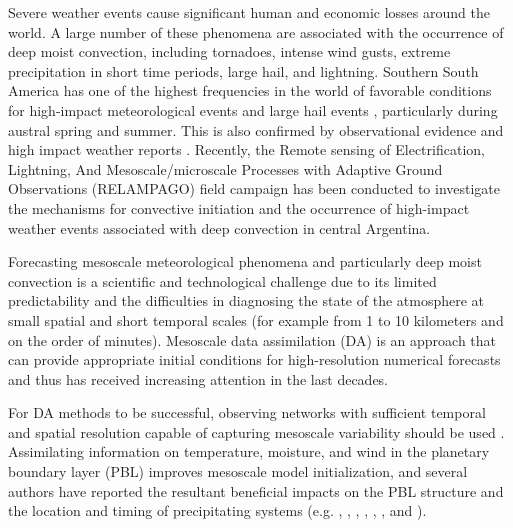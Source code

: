 \documentclass[final,5p,times,twocolumn,authoryear]{elsarticle} %
\begin{document}
Severe weather events cause significant human and economic losses around the world. A large number of these phenomena are associated with the occurrence of deep moist convection, including tornadoes, intense wind gusts, extreme precipitation in short time periods, large hail, and lightning.
Southern South America has one of the highest frequencies in the world of favorable conditions for high-impact meteorological events \citep{brooks2003} and large hail events \citep{cecil2012}, particularly during austral spring and summer.
This is also confirmed by observational evidence and high impact weather reports \citep{matsudo2015, rasmussen2014}. Recently, the Remote sensing of Electrification, Lightning, And Mesoscale/microscale Processes with Adaptive Ground Observations (RELAMPAGO) field campaign \citep{nesbitt2021} has been conducted to investigate the mechanisms for convective initiation and the occurrence of high-impact weather events associated with deep convection in central Argentina.

Forecasting mesoscale meteorological phenomena and particularly deep moist convection is a scientific and technological challenge due to its limited predictability and the difficulties in diagnosing the state of the atmosphere at small spatial and short temporal scales (for example from 1 to 10 kilometers and on the order of minutes). Mesoscale data assimilation (DA) is an approach that can provide appropriate initial conditions for high-resolution numerical forecasts \citep{sun2014} and thus has received increasing attention in the last decades.

For DA methods to be successful, observing networks with sufficient temporal and spatial resolution capable of capturing mesoscale variability should be used \citep{gustafsson2018}. Assimilating information on temperature, moisture, and wind in the planetary boundary layer (PBL) improves mesoscale model initialization, and several authors have reported the resultant beneficial impacts on the PBL structure and the location and timing of precipitating systems (e.g. \citet{wheatley2010}, \citet{ha2014}, \citet{chang2017}, \citet{bae2022}, \citet{banos2021}, \citet{maejima2019}, and \citet{chen2016}).
\end{document}
